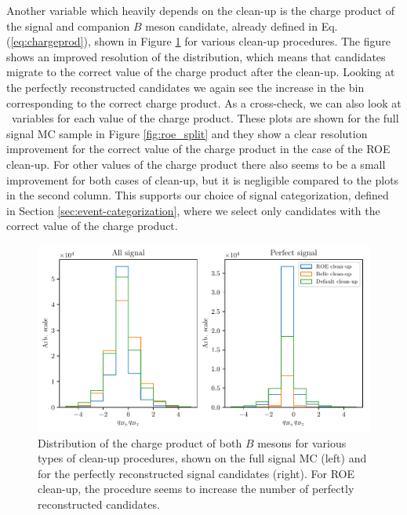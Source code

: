 Another variable which heavily depends on the clean-up is the charge product of the signal and companion $B$ meson candidate, already defined in Eq. (\ref{eq:chargeprod}), shown in Figure \ref{fig:roe_chargeproduct} for various clean-up procedures. The figure shows an improved resolution of the distribution, which means that candidates migrate to the correct value of the charge product after the clean-up. Looking at the perfectly reconstructed candidates we again see the increase in the bin corresponding to the correct charge product. As a cross-check, we can also look at \vars~variables for each value of the charge product. These plots are shown for the full signal MC sample in Figure \ref{fig:roe_split} and they show a clear resolution improvement for the correct value of the charge product in the case of the ROE clean-up. For other values of the charge product there also seems to be a small improvement for both cases of clean-up, but it is negligible compared to the plots in the second column. This supports our choice of signal categorization, defined in Section \ref{sec:event-categorization}, where we select only candidates with the correct value of the charge product.

\begin{figure}[H]
\centering
\captionsetup{width=0.8\linewidth}
\includegraphics[width=\linewidth]{fig/roe_chargeprod}
\caption{Distribution of the charge product of both $B$ mesons for various types of clean-up procedures, shown on the full signal MC (left) and for the perfectly reconstructed signal candidates (right). For ROE clean-up, the procedure seems to increase the number of perfectly reconstructed candidates.}
\label{fig:roe_chargeproduct}
\end{figure}

